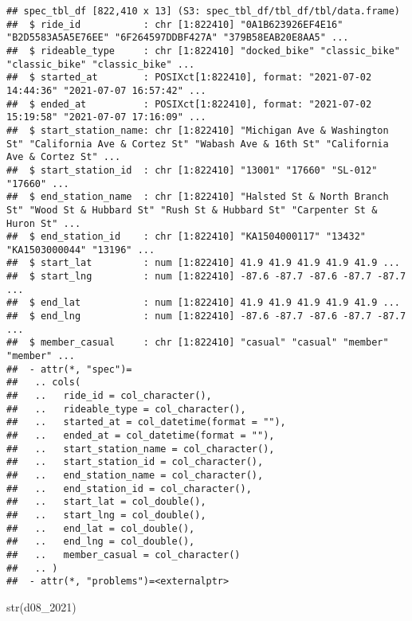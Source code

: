 \documentclass[
]{article}
\newenvironment{Shaded}{\begin{snugshade}}{\end{snugshade}}
\newcommand{\FunctionTok}[1]{\textcolor[rgb]{0.00,0.00,0.00}{#1}}
\newcommand{\NormalTok}[1]{#1}
\begin{document}
\begin{verbatim}
## spec_tbl_df [822,410 x 13] (S3: spec_tbl_df/tbl_df/tbl/data.frame)
##  $ ride_id           : chr [1:822410] "0A1B623926EF4E16" "B2D5583A5A5E76EE" "6F264597DDBF427A" "379B58EAB20E8AA5" ...
##  $ rideable_type     : chr [1:822410] "docked_bike" "classic_bike" "classic_bike" "classic_bike" ...
##  $ started_at        : POSIXct[1:822410], format: "2021-07-02 14:44:36" "2021-07-07 16:57:42" ...
##  $ ended_at          : POSIXct[1:822410], format: "2021-07-02 15:19:58" "2021-07-07 17:16:09" ...
##  $ start_station_name: chr [1:822410] "Michigan Ave & Washington St" "California Ave & Cortez St" "Wabash Ave & 16th St" "California Ave & Cortez St" ...
##  $ start_station_id  : chr [1:822410] "13001" "17660" "SL-012" "17660" ...
##  $ end_station_name  : chr [1:822410] "Halsted St & North Branch St" "Wood St & Hubbard St" "Rush St & Hubbard St" "Carpenter St & Huron St" ...
##  $ end_station_id    : chr [1:822410] "KA1504000117" "13432" "KA1503000044" "13196" ...
##  $ start_lat         : num [1:822410] 41.9 41.9 41.9 41.9 41.9 ...
##  $ start_lng         : num [1:822410] -87.6 -87.7 -87.6 -87.7 -87.7 ...
##  $ end_lat           : num [1:822410] 41.9 41.9 41.9 41.9 41.9 ...
##  $ end_lng           : num [1:822410] -87.6 -87.7 -87.6 -87.7 -87.7 ...
##  $ member_casual     : chr [1:822410] "casual" "casual" "member" "member" ...
##  - attr(*, "spec")=
##   .. cols(
##   ..   ride_id = col_character(),
##   ..   rideable_type = col_character(),
##   ..   started_at = col_datetime(format = ""),
##   ..   ended_at = col_datetime(format = ""),
##   ..   start_station_name = col_character(),
##   ..   start_station_id = col_character(),
##   ..   end_station_name = col_character(),
##   ..   end_station_id = col_character(),
##   ..   start_lat = col_double(),
##   ..   start_lng = col_double(),
##   ..   end_lat = col_double(),
##   ..   end_lng = col_double(),
##   ..   member_casual = col_character()
##   .. )
##  - attr(*, "problems")=<externalptr>
\end{verbatim}

\begin{Shaded}
\begin{Highlighting}[]
\FunctionTok{str}\NormalTok{(d08\_2021)}
\end{Highlighting}
\end{Shaded}
\end{document}
